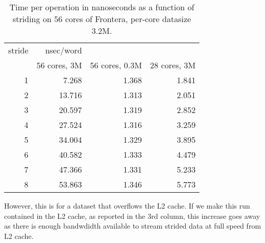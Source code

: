 \begin{table}
  \begin{tabular}{rrrr}
    \toprule
    stride&nsec/word&&\\
    &56 cores, 3M& 56 cores, 0.3M&28 cores, 3M\\
    \midrule
  1 &  7.268 & 1.368 & 1.841\\
  2 & 13.716 & 1.313 & 2.051\\
  3 & 20.597 & 1.319 & 2.852\\
  4 & 27.524 & 1.316 & 3.259\\
  5 & 34.004 & 1.329 & 3.895\\
  6 & 40.582 & 1.333 & 4.479\\
  7 & 47.366 & 1.331 & 5.233\\
  8 & 53.863 & 1.346 & 5.773\\
    \bottomrule
  \end{tabular}
  \caption{Time per operation in nanoseconds as a function of striding on 56 cores of Frontera, per-core datasize 3.2M.}
  \label{fig:strides-p56-k3200}
\end{table}

However, this is for a dataset that overflows the L2 cache.
If we make this run contained in the L2 cache,
as reported in the 3rd column,
this increase goes away as there is enough bandwdidth
available to stream strided data at full speed from L2 cache.

